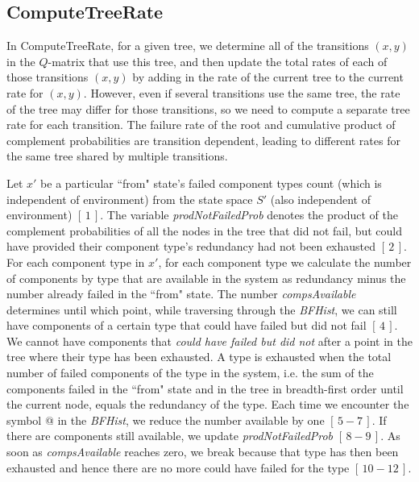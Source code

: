 \documentclass[12pt]{article}
\newcommand{\citeLine}[1]{$[\,#1\,]$}
\newcommand{\citeBlock}[2]{$[\,#1 - #2\,]$}
\begin{document}
\subsection{ComputeTreeRate}

In ComputeTreeRate, for a given tree, we determine all of the transitions $(x,y)$ in the $Q$-matrix that use this tree, and then update  the total rates of each of those transitions $(x,y)$ by adding in the rate of the current tree to the current rate for $(x,y)$. However, even if several transitions use the same tree, the rate of the tree may differ for those transitions, so we need to compute a separate tree rate for each transition. The failure rate of the root and cumulative product of complement probabilities are transition dependent, leading to different rates for the same tree shared by multiple transitions.

Let $x'$ be a particular ``from" state's failed component types count (which is independent of environment) from the state space $S'$ (also independent of environment) \citeLine{1}. The variable \textit{prodNotFailedProb} denotes the product of the complement probabilities of all the nodes in the tree that did not fail, but could have provided their component type's redundancy had not been exhausted \citeLine{2}. For each component type in $x'$, for each component type we calculate the number of components by type that are available in the system as redundancy minus the number already failed in the ``from" state. The number \textit{compsAvailable} determines until which point, while traversing through the \textit{BFHist}, we can still have components of a certain type that could have failed but did not fail \citeLine{4}. We cannot have components that \textit{could have failed but did not} after a point in the tree where their type has been exhausted. A type is exhausted when the total number of failed components of the type in the system, i.e. the sum of the components failed in the ``from" state and in the tree in breadth-first order until the current node, equals the redundancy of the type. Each time we encounter the symbol @ in the \textit{BFHist}, we reduce the number available by one \citeBlock{5}{7}. If there are components still available, we update \textit{prodNotFailedProb} \citeBlock{8}{9}. As soon as \textit{compsAvailable} reaches zero, we break because that type has then been exhausted and hence there are no more could have failed for the type \citeBlock{10}{12}.
\end{document}

